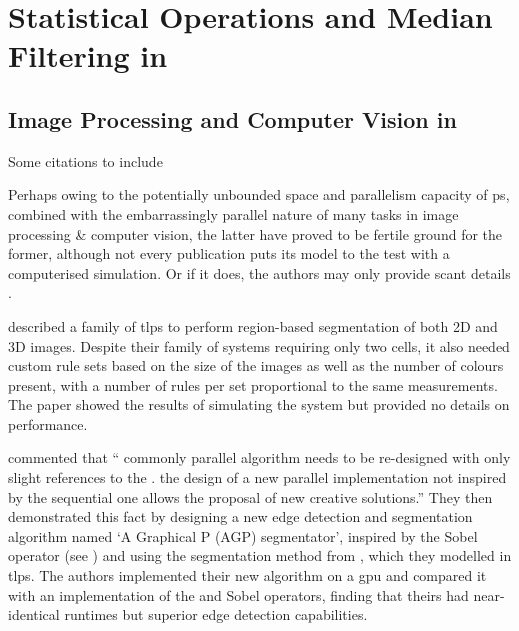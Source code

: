 \newcommand{\hopac}{Hopac}
\chapter{\label{chap:median}Statistical Operations and Median Filtering in }





\section{\label{subsec:imgprocpsys}Image Processing and Computer Vision in }
\begin{anfxwarning}{Some citations to include}
\cite{Zhang2012,Yuan2019}
\end{anfxwarning}

Perhaps owing to the potentially unbounded space and parallelism capacity of \gls{ps}, combined with the embarrassingly parallel nature of many tasks in image processing \& computer vision, the latter have proved to be fertile ground for the former, although not every publication puts its model to the test with a computerised simulation.  Or if it does, the authors may only provide scant details \cite{Diaz-Pernil2019}.

\citeauthor{Christinal2011} \cite{Christinal2011} described a family of \gls{tlps} to perform region-based segmentation of both 2D and 3D images.  Despite their family of systems requiring only two cells, it also needed custom rule sets based on the size of the images as well as the number of colours present, with a number of rules per set proportional to the same measurements.  The paper showed the results of simulating the system but provided no details on performance.

\citeauthor{Diaz-Pernil2013} \cite{Diaz-Pernil2013} commented that \enquote{\textelp{} commonly  parallel algorithm needs to be re-designed with only slight references to the .  \textelp{} the design of a new parallel implementation not inspired by the sequential one allows \textelp{} the proposal of new creative solutions.}  They then demonstrated this fact by designing a new edge detection and segmentation algorithm named `A Graphical P (AGP) segmentator', inspired by the Sobel operator (see \eg{} \cite{Nixon2012}) and using the segmentation method from \cite{Christinal2011}, which they modelled in \gls{tlps}.  The authors implemented their new algorithm on a \gls{gpu} and compared it with an implementation of the  and  Sobel operators, finding that theirs had near-identical runtimes but superior edge detection capabilities.

